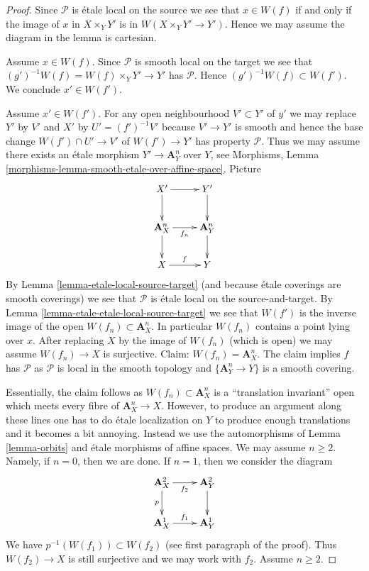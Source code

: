 \documentclass{stacks-project}
\theoremstyle{plain}
\theoremstyle{definition}
\theoremstyle{remark}
\numberwithin{equation}{subsection}
\begin{document}
\begin{proof}
Since $\mathcal{P}$ is \'etale local on the source we see
that $x \in W(f)$ if and only if the image of $x$ in
$X \times_Y Y'$ is in $W(X \times_Y Y' \to Y')$. Hence we
may assume the diagram in the lemma is cartesian.

\medskip\noindent
Assume $x \in W(f)$. Since $\mathcal{P}$ is smooth local on the target
we see that $(g')^{-1}W(f) = W(f) \times_Y Y' \to Y'$ has $\mathcal{P}$.
Hence $(g')^{-1}W(f) \subset W(f')$. We conclude $x' \in W(f')$.

\medskip\noindent
Assume $x' \in W(f')$.
For any open neighbourhood $V' \subset Y'$ of $y'$ we may replace
$Y'$ by $V'$ and $X'$ by $U' = (f')^{-1}V'$ because $V' \to Y'$ is smooth
and hence the base change $W(f') \cap U' \to V'$ of $W(f') \to Y'$
has property $\mathcal{P}$. Thus we may assume there exists
an \'etale morphism $Y' \to \mathbf{A}^n_Y$ over $Y$, see
Morphisms, Lemma \ref{morphisms-lemma-smooth-etale-over-affine-space}.
Picture
$$
\xymatrix{
X' \ar[r] \ar[d] & Y' \ar[d] \\
\mathbf{A}^n_X \ar[r]_{f_n} \ar[d] & \mathbf{A}^n_Y \ar[d] \\
X \ar[r]^f & Y
}
$$
By Lemma \ref{lemma-etale-local-source-target}
(and because \'etale coverings are smooth coverings)
we see that $\mathcal{P}$ is \'etale local on the source-and-target.
By Lemma \ref{lemma-etale-etale-local-source-target}
we see that $W(f')$ is the inverse image of
the open $W(f_n) \subset \mathbf{A}^n_X$. In particular
$W(f_n)$ contains a point lying over $x$.
After replacing $X$ by the image of $W(f_n)$ (which is open)
we may assume $W(f_n) \to X$ is surjective.
Claim: $W(f_n) = \mathbf{A}^n_X$.
The claim implies $f$ has $\mathcal{P}$ as
$\mathcal{P}$ is local in the smooth topology
and $\{\mathbf{A}^n_Y \to Y\}$ is a smooth covering.

\medskip\noindent
Essentially, the claim follows as $W(f_n) \subset \mathbf{A}^n_X$ is a
``translation invariant'' open which meets every fibre of
$\mathbf{A}^n_X \to X$. However, to produce an argument along these lines
one has to do \'etale localization on $Y$ to produce enough translations
and it becomes a bit annoying. Instead we use the automorphisms
of Lemma \ref{lemma-orbits} and \'etale morphisms of affine spaces.
We may assume $n \geq 2$. Namely, if $n = 0$, then we are done.
If $n = 1$, then we consider the diagram
$$
\xymatrix{
\mathbf{A}^2_X \ar[r]_{f_2} \ar[d]_p & \mathbf{A}^2_Y \ar[d] \\
\mathbf{A}^1_X \ar[r]^{f_1} & \mathbf{A}^1_Y
}
$$
We have $p^{-1}(W(f_1)) \subset W(f_2)$ (see first paragraph
of the proof). Thus $W(f_2) \to X$ is still surjective
and we may work with $f_2$. Assume $n \geq 2$.


\end{proof}
\end{document}
